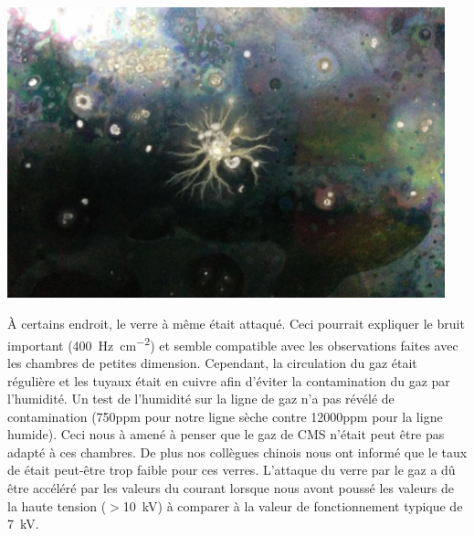\begin{minipage}[th!]{1\textwidth}
\begin{minipage}[th!]{0.48\textwidth}
\begin{minipage}[th!]{1\textwidth}
			\label{perle}
		\end{minipage}%
		\\
		\begin{minipage}[th!]{1\textwidth}
			\noindent
			\centering
			\includegraphics[width=0.95\textwidth]{GLA/depot2.jpg}
			\label{depot2}
		\end{minipage}%
	\end{minipage}%
	\label{probs}
\end{minipage}%

 À certains endroit, le verre à même était attaqué. Ceci pourrait expliquer le bruit important (\SI{400}{\hertz\per\square\centi\meter}) et semble compatible avec les observations faites avec les chambres de petites dimension. Cependant, la circulation du gaz était régulière et les tuyaux était en cuivre afin d'éviter la contamination du gaz par l'humidité. Un test de l'humidité sur la ligne de gaz n'a pas révélé de contamination (\num{750}ppm pour notre ligne sèche contre \num{12000}ppm pour la ligne humide). Ceci nous à amené à penser que le gaz de CMS n'était peut être pas adapté à ces chambres. De plus nos collègues chinois nous ont informé que le taux de  était peut-être trop faible pour ces verres. L'attaque du verre par le gaz a dû être accéléré par les valeurs du courant lorsque nous avont poussé les valeurs de la haute tension ($>$\SI{10}{\kilo\volt}) à comparer à la valeur de fonctionnement typique de \SI{7}{\kilo\volt}.
 
 
 
 
 